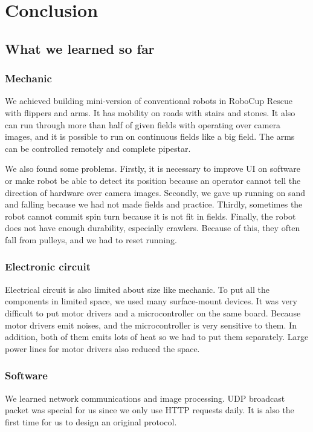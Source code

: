 \documentclass[journal]{IEEEtran}
\begin{document}
\section{Conclusion}
\subsection{What we learned so far}
\subsubsection{Mechanic}{}
We achieved building mini-version of conventional robots in RoboCup Rescue with flippers and arms.
It has mobility on roads with stairs and stones.
It also can run through more than half of given fields with operating over camera images, and it is possible to run on continuous fields like a big field.
The arms can be controlled remotely and complete pipestar.

We also found some problems.
Firstly, it is necessary to improve UI on software or make robot be able to detect its position because an operator cannot tell the direction of hardware over camera images.
Secondly, we gave up running on sand and falling because we had not made fields and practice.
Thirdly, sometimes the robot cannot commit spin turn because it is not fit in fields.
Finally, the robot does not have enough durability, especially crawlers.
Because of this, they often fall from pulleys, and we had to reset running.

\subsubsection{Electronic circuit}
Electrical circuit is also limited about size like mechanic.
To put all the components in limited space, we used many surface-mount devices.
It was very difficult to put motor drivers and a microcontroller on the same board.
Because motor drivers emit noises, and the microcontroller is very sensitive to them.
In addition, both of them emits lots of heat so we had to put them separately.
Large power lines for motor drivers also reduced the space.

\subsubsection{Software}
We learned network communications and image processing.
UDP broadcast packet was special for us since we only use HTTP requests daily.
It is also the first time for us to design an original protocol.
\end{document}
